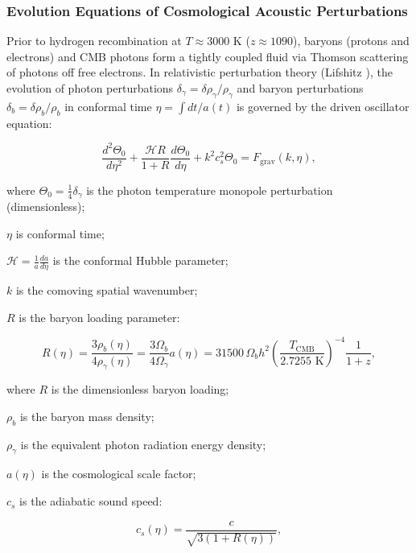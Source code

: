 \subsubsection{Evolution Equations of Cosmological Acoustic Perturbations}\label{sec:4.4.2}

Prior to hydrogen recombination at $T \approx 3000\text{ K}$ ($z \approx 1090$), baryons (protons and electrons) and CMB photons form a tightly coupled fluid via Thomson scattering of photons off free electrons. In relativistic perturbation theory (Lifshitz \cite{ref33}), the evolution of photon perturbations $\delta_\gamma = \delta \rho_\gamma / \rho_\gamma$ and baryon perturbations $\delta_b = \delta \rho_b / \rho_b$ in conformal time $\eta = \int dt / a(t)$ is governed by the driven oscillator equation:

\begin{equation}\label{eq:4.41}\tag{4.41}
\frac{d^2 \Theta_0}{d\eta^2} + \frac{\mathcal{H} R}{1+R} \frac{d\Theta_0}{d\eta} + k^2 c_s^2 \Theta_0 = F_{\text{grav}}(k, \eta),
\end{equation}

where $\Theta_0 = \frac{1}{4}\delta_\gamma$ is the photon temperature monopole perturbation (dimensionless);  

$\eta$ is conformal time;  

$\mathcal{H} = \frac{1}{a} \frac{da}{d\eta}$ is the conformal Hubble parameter;  

$k$ is the comoving spatial wavenumber;  

$R$ is the baryon loading parameter:

\begin{equation}\label{eq:4.42}\tag{4.42}
R(\eta) = \frac{3 \rho_b(\eta)}{4 \rho_\gamma(\eta)} = \frac{3 \Omega_b}{4 \Omega_\gamma} a(\eta) = 31500\,\Omega_b h^2 \left( \frac{T_{\text{CMB}}}{2.7255\text{ K}} \right)^{-4} \frac{1}{1+z},
\end{equation}

where $R$ is the dimensionless baryon loading;  

$\rho_b$ is the baryon mass density;  

$\rho_\gamma$ is the equivalent photon radiation energy density;  

$a(\eta)$ is the cosmological scale factor;  

$c_s$ is the adiabatic sound speed:

\begin{equation}\label{eq:4.43}\tag{4.43}
c_s(\eta) = \frac{c}{\sqrt{3 (1 + R(\eta))}},
\end{equation}

